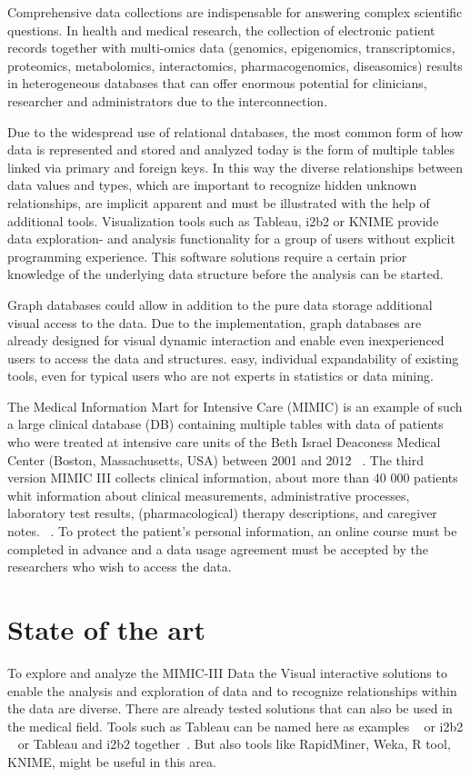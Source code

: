 Comprehensive data collections are indispensable for answering complex scientific questions. In health and medical research, the collection of electronic patient records together with multi-omics data (genomics, epigenomics, transcriptomics, proteomics, metabolomics, interactomics, pharmacogenomics, diseasomics) results in heterogeneous databases that can offer enormous potential for clinicians, researcher and administrators due to the interconnection. 

Due to the widespread use of relational databases, the most common form of how data is represented and stored and analyzed today is the form of multiple tables linked via primary and foreign keys. In this way the diverse relationships between data values and types, which are important to recognize hidden unknown relationships, are implicit apparent and must be illustrated with the help of additional tools. Visualization tools such as Tableau, i2b2 or KNIME provide data exploration- and analysis functionality for a group of users without explicit programming experience. This software solutions require a certain prior knowledge of the underlying data structure before the analysis can be started. 

Graph databases could allow in addition to the pure data storage additional visual access to the data. Due to the implementation, graph databases are already designed for visual dynamic interaction and enable even inexperienced users to access the data and structures. easy, individual expandability of existing tools, even for typical users who are not experts in statistics or data mining. 

The Medical Information Mart for Intensive Care (MIMIC) is an example of such a large clinical database (DB) containing multiple tables with data of patients who were treated at intensive care units of the Beth Israel Deaconess Medical Center (Boston, Massachusetts, USA) between 2001 and 2012 ~\cite{Johnson.2016}. The third version MIMIC III collects clinical information, about more than 40 000 patients whit information about clinical measurements, administrative processes, laboratory test results, (pharmacological) therapy descriptions, and caregiver notes. ~\cite{Johnson.2016}. To protect the patient's personal information, an online course must be completed in advance and a data usage agreement must be accepted by the researchers who wish to access the data.


\section{State of the art}\label{s2}
To explore and analyze the MIMIC-III Data the 
Visual interactive solutions to enable the analysis and exploration of data and to recognize relationships within the data are diverse. There are already tested solutions that can also be used in the medical field. Tools such as Tableau can be named here as examples ~\cite{Ko.2017} or i2b2 ~\cite{Murphy.2014} or Tableau and i2b2 together~\cite{Harris.2016}. But also tools like RapidMiner, Weka, R tool, KNIME, might be useful in this area. \cite{Dwivedi.18.03.201619.03.2016}



